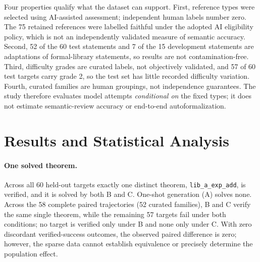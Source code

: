 \documentclass[runningheads,a4paper]{llncs}
\begin{document}
Four properties qualify what the dataset can support. First, reference types were
selected using AI-assisted assessment; independent human labels number zero. The 75
retained references were labelled faithful under the adopted AI eligibility policy,
which is not an independently validated measure of semantic accuracy. Second, 52 of
the 60 test statements and 7 of the 15 development statements are adaptations of
formal-library statements, so results are not contamination-free. Third, difficulty
grades are curated labels, not objectively validated, and 57 of 60 test targets
carry grade 2, so the test set has little recorded difficulty variation. Fourth,
curated families are human groupings, not independence guarantees. The study
therefore evaluates model attempts \emph{conditional on} the fixed types; it does
not estimate semantic-review accuracy or end-to-end autoformalization.

\section{Results and Statistical Analysis}
\paragraph{One solved theorem.} Across all 60 held-out targets exactly one distinct
theorem, \texttt{lib\_a\_exp\_add}, is verified, and it is solved by both B and C.
One-shot generation (A) solves none. Across the 58 complete paired trajectories (52 curated families), B and C verify the same single theorem, while the remaining 57 targets fail under both conditions; no target is verified only under B and none only under C. With zero discordant verified-success outcomes, the observed paired difference is zero; however, the sparse data cannot establish equivalence or precisely determine the population effect.

\begin{table}[tbp]
\caption{Observed verification outcomes and known completed-response resources.
C has two unavailable outcomes (primary rate 1/58). Repair means use the 60-case
denominator. Resource totals include the shared initial in each counterfactual row
and impute nothing for missing calls.}
\label{tab:main}
\centering\footnotesize\setlength{\tabcolsep}{3pt}
\end{table}
\end{document}
